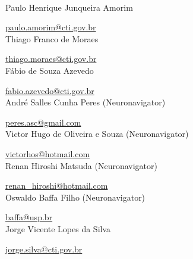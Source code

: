 \scalebox{2.0}{\sffamily Authors}
\\

Paulo Henrique Junqueira Amorim

\href{mailto:paulo.amorim@cti.gov.br}{paulo.amorim@cti.gov.br}
\\


Thiago Franco de Moraes

\href{mailto:thiago.moraes@cti.gov.br}{thiago.moraes@cti.gov.br}
\\


Fábio de Souza Azevedo

\href{mailto:fabio.azevedo@cti.gov.br}{fabio.azevedo@cti.gov.br}
\\


André Salles Cunha Peres (Neuronavigator)

\href{mailto:peres.asc@gmail.com}{peres.asc@gmail.com}
\\


Victor Hugo de Oliveira e Souza (Neuronavigator)

\href{mailto:victorhos@hotmail.com}{victorhos@hotmail.com}
\\


Renan Hiroshi Matsuda (Neuronavigator)

\href{mailto:renan\_hiroshi@hotmail.com}{renan\_hiroshi@hotmail.com}
\\


Oswaldo Baffa Filho (Neuronavigator)

\href{mailto:baffa@usp.br}{baffa@usp.br}
\\


Jorge Vicente Lopes da Silva

\href{mailto:jorge.silva@cti.gov.br}{jorge.silva@cti.gov.br}
\\

